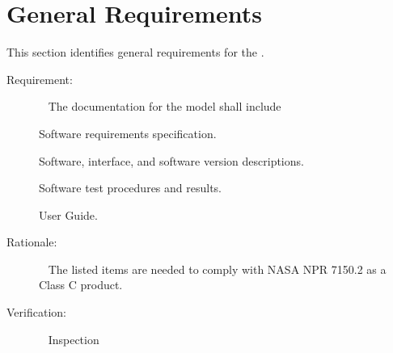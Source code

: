 \documentclass[twoside,11pt,titlepage]{report}
\begin{document}
\section{General Requirements}\label{sec:general_reqts}

This section identifies general requirements for the \MODEL.


\label{reqt:documentation}
\begin{description}
  \item[Requirement:]\ \newline
    The documentation for the model shall include

    \subrequirement{}
    \label{reqt:reqts_doc}
      Software requirements specification.

    \subrequirement{}
    \label{reqt:design_doc}
      Software, interface, and software version descriptions.

    \subrequirement{}
    \label{reqt:test_doc}
      Software test procedures and results.

    \subrequirement{}
    \label{reqt:user_doc}
      User Guide.

  \item[Rationale:]\ \newline
    The listed items are needed to comply with NASA NPR 7150.2
    as a Class C product.

  \item[Verification:]\ \newline
    Inspection
\end{description}
\end{document}
